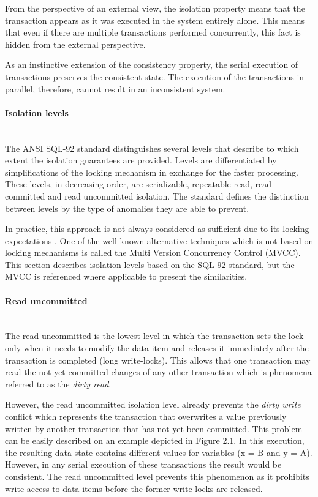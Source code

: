 \documentclass[oneside,
  digital, %
  table,   %
  lof,     %
  lot,     %
]{fithesis3}
\newcommand{\newlinepar}[1]{\paragraph{#1}\needspace{3\baselineskip}\mbox{}\\}
\begin{document}
From the perspective of an external view, the isolation property means that the transaction appears as it was executed in the system entirely alone. This means that even if there are multiple transactions performed concurrently, this fact is hidden from the external perspective.

As an instinctive extension of the consistency property, the serial execution of transactions preserves the consistent state. The execution of the transactions in parallel, therefore, cannot result in an inconsistent system.

\newlinepar{Isolation levels}

The ANSI SQL-92 \cite{sql-92} standard distinguishes several levels that describe to which extent the isolation guarantees are provided. Levels are differentiated by simplifications of the locking mechanism in exchange for the faster processing. These levels, in decreasing order, are serializable, repeatable read, read committed and read uncommitted isolation. The standard defines the distinction between levels by the type of anomalies they are able to prevent. 

In practice, this approach is not always considered as sufficient due to its locking expectations \cite{ansi-sql-critique}. One of the well known alternative techniques which is not based on locking mechanisms is called the Multi Version Concurrency Control (MVCC). This section describes isolation levels based on the SQL-92 standard, but the MVCC is referenced where applicable to present the similarities.

\newlinepar{Read uncommitted}

The read uncommitted is the lowest level in which the transaction sets the lock only when it needs to modify the data item and releases it immediately after the transaction is completed (long write-locks). This allows that one transaction may read the not yet committed changes of any other transaction which is phenomena referred to as the \textit{dirty read}.

However, the read uncommitted isolation level already prevents the \textit{dirty write} conflict which represents the transaction that overwrites a value previously written by another transaction that has not yet been committed. This problem can be easily described on an example depicted in Figure 2.1. In this execution, the resulting data state contains different values for variables (x = B and y = A). However, in any serial execution of these transactions the result would be consistent. The read uncommitted level prevents this phenomenon as it prohibits write access to data items before the former write locks are released.
\end{document}
